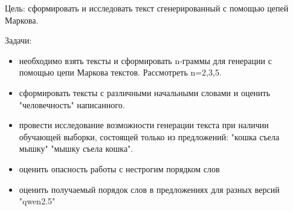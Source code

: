 
Цель: сформировать и исследовать текст сгенерированный с помощью цепей Маркова.

Задачи:
\begin{itemize}
    \item необходимо взять тексты и сформировать n-граммы для генерации с помощью цепи Маркова текстов. Рассмотреть n=2,3,5.
    \item сформировать тексты с различными начальными словами и оценить "человечность" написанного.
    \item провести исследование возможности генерации текста при наличии обучающей выборки, состоящей только из предложений:
    "кошка съела мышку" "мышку съела кошка".
    \item оценить опасность работы с нестрогим порядком слов
    \item оценить получаемый порядок слов в предложениях для разных версий "qwen2.5"
\end{itemize}

\clearpage

